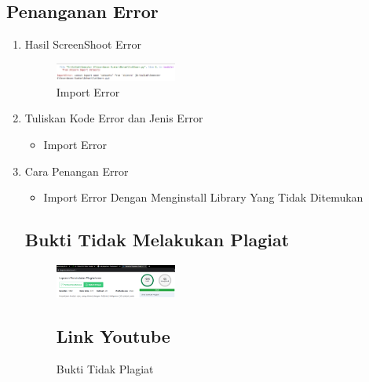 \begin{enumerate}
\subsection{Penanganan Error}
\begin{enumerate}
	\item Hasil ScreenShoot Error
	\begin{figure}[H]
		\includegraphics[width=4cm]{figures/1174015/Error/Error 1.PNG}
		\centering
		\caption{Import Error}
	\end{figure}
	\item Tuliskan Kode Error dan Jenis Error
	\begin{itemize}
		\item Import Error
	\end{itemize}
	\item Cara Penangan Error
	\begin{itemize}
		\item Import Error
		\hfill\break
		Dengan Menginstall Library Yang Tidak Ditemukan
	\end{itemize}
	
\subsection{Bukti Tidak Melakukan Plagiat}
\begin{figure}[H]
	\includegraphics[width=4cm]{figures/1174015/Plagiat/plagiarisme.PNG}
	\centering
	\caption{Bukti Tidak Plagiat }
	
\subsection{Link Youtube}

\end{figure}
\end{enumerate}
\end{enumerate}